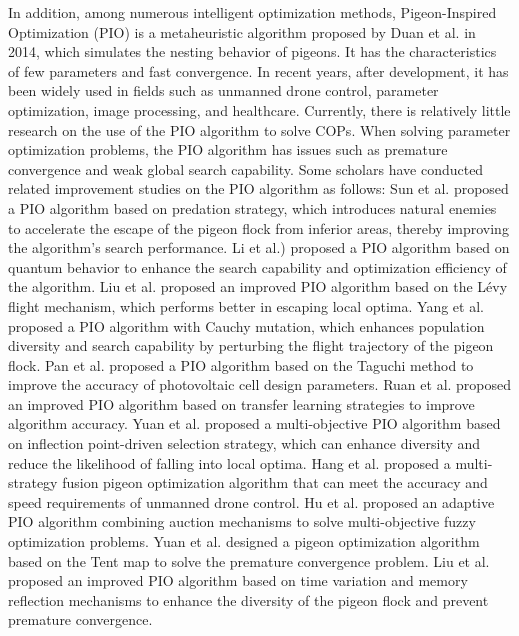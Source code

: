 \documentclass[preprint,review,compress,12pt]{elsarticle}
\begin{document}
In addition, among numerous intelligent optimization methods, Pigeon-Inspired Optimization (PIO) is a metaheuristic algorithm proposed by Duan et al.\cite{duan2014pigeon} in 2014, which simulates the nesting behavior of pigeons. It has the characteristics of few parameters and fast convergence. In recent years, after development, it has been widely used in fields such as unmanned drone control, parameter optimization, image processing, and healthcare\cite{hangxuan2022multi,hou2023flexibility,duan2015echo,rajendran2016novel}. Currently, there is relatively little research on the use of the PIO algorithm to solve COPs. When solving parameter optimization problems, the PIO algorithm has issues such as premature convergence and weak global search capability. Some scholars have conducted related improvement studies on the PIO algorithm as follows: Sun et al.\cite{sun2014pid} proposed a PIO algorithm based on predation strategy, which introduces natural enemies to accelerate the escape of the pigeon flock from inferior areas, thereby improving the algorithm's search performance. Li et al.\cite{li2014bloch}) proposed a PIO algorithm based on quantum behavior to enhance the search capability and optimization efficiency of the algorithm. Liu et al.\cite{liu2016pendulum} proposed an improved PIO algorithm based on the Lévy flight mechanism, which performs better in escaping local optima. Yang et al.\cite{duan2018large,yang2018automatic} proposed a PIO algorithm with Cauchy mutation, which enhances population diversity and search capability by perturbing the flight trajectory of the pigeon flock. Pan et al.\cite{pan2022maximum} proposed a PIO algorithm based on the Taguchi method to improve the accuracy of photovoltaic cell design parameters. Ruan et al.\cite{ruan2022autonomous} proposed an improved PIO algorithm based on transfer learning strategies to improve algorithm accuracy. Yuan et al.\cite{yuan2022active} proposed a multi-objective PIO algorithm based on inflection point-driven selection strategy, which can enhance diversity and reduce the likelihood of falling into local optima. Hang et al.\cite{hangxuan2022multi} proposed a multi-strategy fusion pigeon optimization algorithm that can meet the accuracy and speed requirements of unmanned drone control. Hu et al.\cite{hu2022pigeon} proposed an adaptive PIO algorithm combining auction mechanisms to solve multi-objective fuzzy optimization problems. Yuan et al.\cite{yuan2023consider} designed a pigeon optimization algorithm based on the Tent map to solve the premature convergence problem. Liu et al.\cite{liu2023unmanned} proposed an improved PIO algorithm based on time variation and memory reflection mechanisms to enhance the diversity of the pigeon flock and prevent premature convergence.
\end{document}
